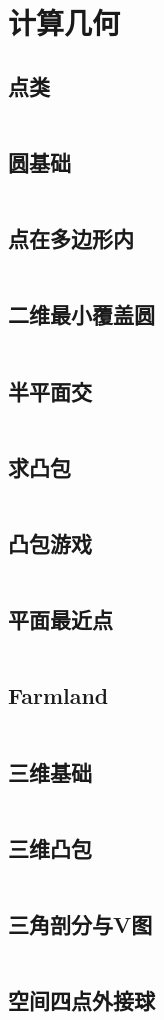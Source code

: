 \chapter{计算几何}
\section{点类}
\inputminted{cpp}{\source/computational-geometry/point.cpp}
\section{圆基础}
\inputminted{cpp}{\source/computational-geometry/circle.cpp}
\section{点在多边形内}
\inputminted{cpp}{\source/computational-geometry/point-in-polygon.cpp}
\section{二维最小覆盖圆}
\inputminted{cpp}{\source/computational-geometry/mincir.cpp}
\section{半平面交}
\inputminted{cpp}{\source/computational-geometry/halfplaneintersection.cpp}
\section{求凸包}
\inputminted{cpp}{\source/computational-geometry/convex-hull.cpp}
\section{凸包游戏}
\inputminted{cpp}{\source/computational-geometry/PlayWithConvex.cpp}
\section{平面最近点}
\inputminted{cpp}{\source/computational-geometry/closest-pair-of-points.cpp}
\section{Farmland}
\inputminted{cpp}{\source/computational-geometry/farmland.cpp}
\section{三维基础}
\inputminted{cpp}{\source/computational-geometry/3DGeo.cpp}
\section{三维凸包}
\inputminted{cpp}{\source/computational-geometry/3DConvex.cpp}
\section{三角剖分与V图}
\inputminted{cpp}{\source/computational-geometry/DelaunayTriangulation.cpp}
\section{空间四点外接球}
\inputminted{cpp}{\source/computational-geometry/min_ball.cpp}
